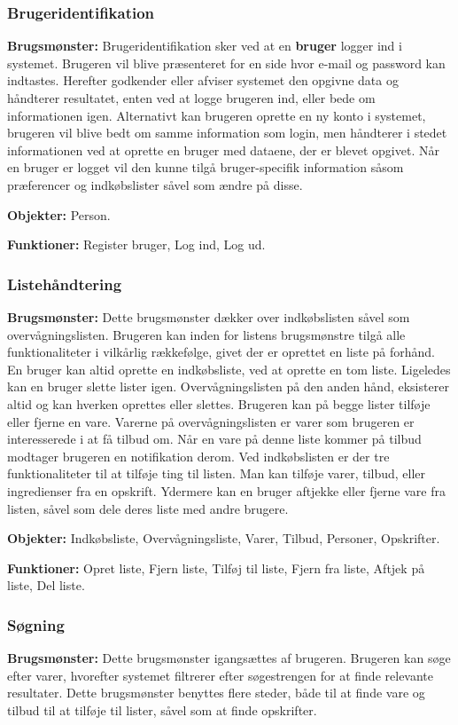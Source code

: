 \subsubsection*{Brugeridentifikation}
\textbf{Brugsmønster:} Brugeridentifikation sker ved at en \textbf{bruger} logger ind i systemet.
Brugeren vil blive præsenteret for en side hvor e-mail og password kan indtastes.
Herefter godkender eller afviser systemet den opgivne data og håndterer resultatet, enten ved at logge brugeren ind, eller bede om informationen igen.
Alternativt kan brugeren oprette en ny konto i systemet, brugeren vil blive bedt om samme information som login, men håndterer i stedet informationen ved at oprette en bruger med dataene, der er blevet opgivet.
Når en bruger er logget vil den kunne tilgå bruger-specifik information såsom præferencer og indkøbslister såvel som ændre på disse.

\textbf{Objekter:} Person.

\textbf{Funktioner:} Register bruger, Log ind, Log ud.

\subsubsection*{Listehåndtering}
\textbf{Brugsmønster:} Dette brugsmønster dækker over indkøbslisten såvel som overvågningslisten.
Brugeren kan inden for listens brugsmønstre tilgå alle funktionaliteter i vilkårlig rækkefølge, givet der er oprettet en liste på forhånd.
En bruger kan altid oprette en indkøbsliste, ved at oprette en tom liste.
Ligeledes kan en bruger slette lister igen.
Overvågningslisten på den anden hånd, eksisterer altid og kan hverken oprettes eller slettes.
Brugeren kan på begge lister tilføje eller fjerne en vare.
Varerne på overvågningslisten er varer som brugeren er interesserede i at få tilbud om.
Når en vare på denne liste kommer på tilbud modtager brugeren en notifikation derom.
Ved indkøbslisten er der tre funktionaliteter til at tilføje ting til listen.
Man kan tilføje varer, tilbud, eller ingredienser fra en opskrift.
Ydermere kan en bruger aftjekke eller fjerne vare fra listen, såvel som dele deres liste med andre brugere.

\textbf{Objekter:} Indkøbsliste, Overvågningsliste, Varer, Tilbud, Personer, Opskrifter.

\textbf{Funktioner:} Opret liste, Fjern liste, Tilføj til liste, Fjern fra liste, Aftjek på liste, Del liste.

\subsubsection*{Søgning}
\textbf{Brugsmønster:} Dette brugsmønster igangsættes af brugeren.
Brugeren kan søge efter varer, hvorefter systemet filtrerer efter søgestrengen for at finde relevante resultater.
Dette brugsmønster benyttes flere steder, både til at finde vare og tilbud til at tilføje til lister, såvel som at finde opskrifter.


